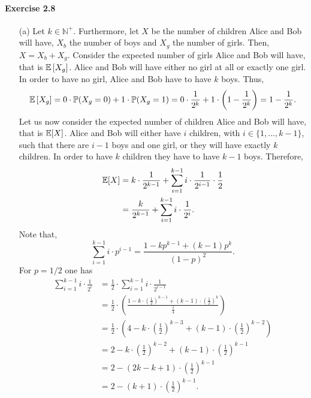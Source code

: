 \paragraph{Exercise 2.8}
\begin{enumerate}
  \item[(a)] Let $k \in \mathbb{N}^+$. Furthermore, let $X$ be the number of
  children Alice and Bob will have, $X_b$ the number of boys and $X_g$ the
  number of girls. Then, $X = X_b + X_g$. Consider the expected number of girls
  Alice and Bob will have, that is $\mathbb{E}\left[X_g\right]$. Alice and Bob will have
  either no girl at all or exactly one girl. In order to have no girl, Alice and
  Bob have to have $k$ boys. Thus,
  \[
    \mathbb{E}\left[X_g\right]
      = 0 \cdot \mathbb{P}(X_g = 0) + 1 \cdot \mathbb{P}(X_g = 1)
      = 0  \cdot \frac{1}{2^k} + 1 \cdot \left( 1 - \frac{1}{2^k} \right)
      = 1 - \frac{1}{2^k}.
  \]
  Let us now consider the expected number of children Alice and Bob will have,
  that is $\mathbb{E}[X]$. Alice and Bob will either have $i$ children, with
  $i \in \{ 1, ..., k-1 \}$, such that there are $i-1$ boys and one girl, or
  they will have exactly $k$ children. In order to have $k$ children they have
  to have $k-1$ boys. Therefore,
  \begin{align*}
    \mathbb{E}[X]
      &= k \cdot \frac{1}{2^{k-1}} + \sum_{i = 1}^{k-1} i \cdot \frac{1}{2^{i-1}} \cdot \frac{1}{2} \\
      &= \frac{k}{2^{k-1}} + \sum_{i = 1}^{k-1} i \cdot \frac{1}{2^{i}}.
  \end{align*}
  Note that,
  \[
    \sum_{i=1}^{k-1} i \cdot p^{i-1} = \frac{1 - kp^{k-1} + (k-1)p^k}{(1-p)^2}.
  \]
  For $p = 1/2$ one has
  \begin{align*}
    \sum_{i = 1}^{k-1} i \cdot \frac{1}{2^{i}}
      &= \frac{1}{2} \cdot \sum_{i = 1}^{k-1} i \cdot \frac{1}{2^{i-1}} \\
      &= \frac{1}{2} \cdot \left(\frac{1 - k \cdot \left(\frac{1}{2}\right)^{k-1} + (k-1)\cdot \left(\frac{1}{2}\right)^{k}}{\frac{1}{4}}\right) \\
      &= \frac{1}{2} \cdot \left(4 - k \cdot \left(\frac{1}{2}\right)^{k-3} + (k-1)\cdot \left(\frac{1}{2}\right)^{k-2} \right) \\
      &= 2 - k \cdot \left(\frac{1}{2}\right)^{k-2} + (k-1)\cdot \left(\frac{1}{2}\right)^{k-1} \\
      &= 2 - \left( 2k - k + 1 \right) \cdot \left(\frac{1}{2}\right)^{k-1} \\
      &= 2 - \left( k + 1 \right) \cdot \left(\frac{1}{2}\right)^{k-1}.

\end{align*}
\end{enumerate}
